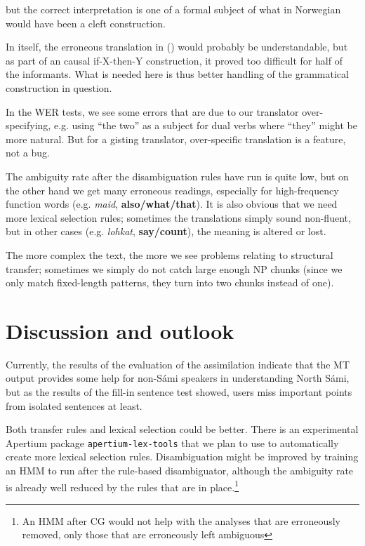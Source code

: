 \documentclass{book}
\begin{document}
but the correct interpretation is one of a formal subject of
what in Norwegian would have been a cleft construction.

In itself, the erroneous translation in () would probably be
understandable, but as part of an causal if-X-then-Y construction, it
proved too difficult for half of the informants. What is needed here
is thus better handling of the grammatical construction in question.

In the WER tests, we see some errors that are due to our translator
over-specifying, e.g. using ``the two'' as a subject for dual verbs
where ``they'' might be more natural. But for a gisting translator,
over-specific translation is a feature, not a bug.

The ambiguity rate after the disambiguation rules have run is quite
low, but on the other hand we get many erroneous readings, especially
for high-frequency function words (e.g. \textit{maid},
\textbf{also/what/that}). It is also obvious that we need more lexical
selection rules; sometimes the translations simply sound non-fluent,
but in other cases (e.g. \textit{lohkat}, \textbf{say/count}), the
meaning is altered or lost.

The more complex the text, the more we see problems relating to
structural transfer; sometimes we simply do not catch large enough NP
chunks (since we only match fixed-length patterns, they turn into two
chunks instead of one).


\section{Discussion and outlook}
Currently, the results of the evaluation of the assimilation indicate
that the MT output provides some help for non-S\'{a}mi speakers in
understanding North S\'{a}mi, but as the results of the fill-in sentence
test showed, users miss important points from isolated sentences at
least.

Both transfer rules and lexical selection could be better. There is an
experimental Apertium package \texttt{apertium-lex-tools} that we plan
to use to automatically create more lexical selection rules.
Disambiguation might be improved by training an HMM to run after the
rule-based disambiguator, although the ambiguity rate is already well
reduced by the rules that are in place.\footnote{An HMM after CG would
  not help with the analyses that are erroneously removed, only those
  that are erroneously left ambiguous}
\end{document}
